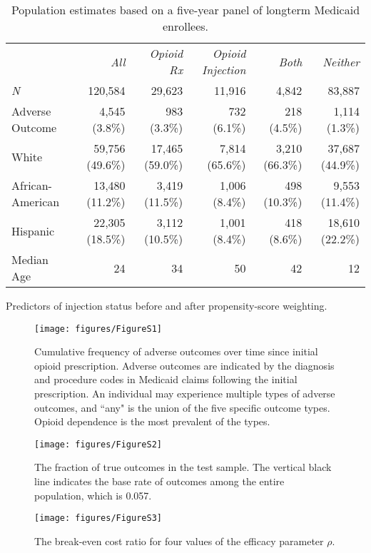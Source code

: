 \documentclass[9pt,twoside]{pnas-new}
\begin{document}
\begin{table}
\caption{Population estimates based on a five-year panel of longterm Medicaid enrollees.}
\centering
\begin{tabular}{lrrrrr}
 & \em All & \em Opioid Rx & \em Opioid Injection & \em Both & \em Neither \\[0.5em]
\em N & 120,584 & 29,623 & 11,916 & 4,842 & 83,887 \\
Adverse Outcome & 4,545 (3.8\%) & 983 (3.3\%) & 732 (6.1\%) & 218 (4.5\%) & 1,114 (1.3\%) \\
White & 59,756 (49.6\%) & 17,465 (59.0\%) & 7,814 (65.6\%) & 3,210 (66.3\%) & 37,687 (44.9\%) \\
African-American & 13,480 (11.2\%) & 3,419 (11.5\%) & 1,006 (8.4\%) & 498 (10.3\%) & 9,553 (11.4\%) \\
Hispanic & 22,305 (18.5\%) & 3,112 (10.5\%) & 1,001 (8.4\%) & 418 (8.6\%) & 18,610 (22.2\%) \\
Median Age & 24 & 34 & 50 & 42 & 12
\end{tabular}
\end{table}

\begin{table}
\caption{Predictors of injection status before and after propensity-score weighting.}
\centering
\small

\end{table}

\begin{figure}
\caption{Cumulative frequency of adverse outcomes over time since initial opioid prescription. Adverse outcomes are indicated by the diagnosis and procedure codes in Medicaid claims following the initial prescription. An individual may experience multiple types of adverse outcomes, and ``any" is the union of the five specific outcome types. Opioid dependence is the most prevalent of the types.}
\centering
\texttt{[image: figures/FigureS1]}
\end{figure}

\begin{figure}
\caption{The fraction of true outcomes in the test sample. The vertical black line indicates the base rate of outcomes among the entire population, which is 0.057.}
\centering
\texttt{[image: figures/FigureS2]}
\end{figure}

\begin{figure}
\caption{The break-even cost ratio for four values of the efficacy parameter $\rho$.}
\centering
\texttt{[image: figures/FigureS3]}
\end{figure}
\end{document}
